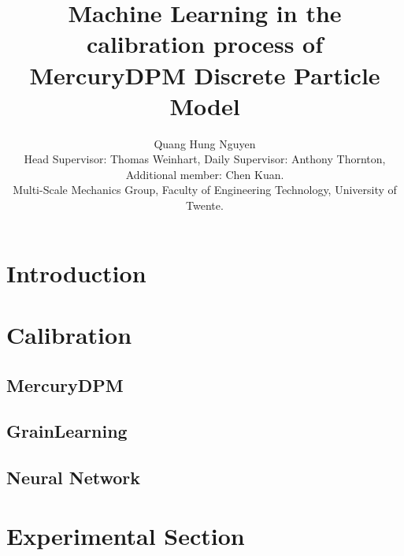 \documentclass{article}
\title{Machine Learning in the calibration process of MercuryDPM Discrete Particle Model}
\author{Quang Hung Nguyen\\[1ex] \small Head Supervisor: Thomas Weinhart, Daily Supervisor: Anthony Thornton, Additional member: Chen Kuan. \\
\small Multi-Scale Mechanics Group, Faculty of Engineering Technology, University of Twente.}
\date{}
\begin{document}
\maketitle

\section{Introduction}





% 





\section{Calibration} \label{section:Calibration}



\subsection{MercuryDPM}


\subsection{GrainLearning}


\subsection{Neural Network}


\section{Experimental Section}


\pagebreak  


\end{document}
